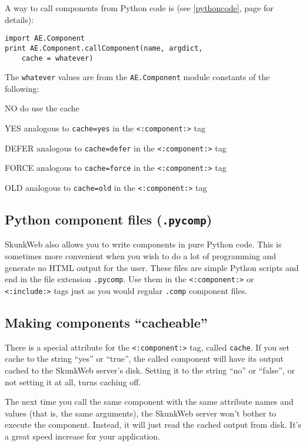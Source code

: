 \documentclass{manual}
\begin{document}
A way to call components from Python code is (see \ref{pythoncode},
page \pageref{pythoncode} for details):
\begin{verbatim}
import AE.Component
print AE.Component.callComponent(name, argdict, 
	cache = whatever)
\end{verbatim}
The \texttt{whatever} values are from the \texttt{AE.Component} module constants of the following:
\label{whatevervals}
\begin{argdesc}
\item[NO] do use the cache
\item[YES] analogous to \texttt{cache=yes} in the \texttt{<:component:>} tag
\item[DEFER] analogous to \texttt{cache=defer} in the
\texttt{<:component:>} tag
\item[FORCE] analogous to \texttt{cache=force} in the
\texttt{<:component:>} tag
\item[OLD] analogous to \texttt{cache=old} in the
\texttt{<:component:>} tag
\end{argdesc}

\subsection{Python component files (\texttt{.pycomp})}

SkunkWeb also allows you to write components in pure Python
code. This is sometimes more convenient when you wish to do a lot
of programming and generate no HTML output for the user. These files
are simple Python scripts and end in the file extension \texttt{.pycomp}.
Use them in the \texttt{<:component:>} or
\texttt{<:include:>} 
tags just as you would regular \texttt{.comp} component files.


\subsection{Making components ``cacheable''}
\label{tagcomponentcaching}

There is a special attribute for the \texttt{<:component:>} 
tag, called \texttt{cache}. If you set cache to the string ``yes''
or ``true'', the called component will have its output cached 
to the SkunkWeb server's disk. Setting it to the string ``no'' or
``false'', or not setting it at all, turns caching off.

The next time you call the same component with the same attribute
names and values (that is, the same arguments), the SkunkWeb server
won't bother to execute the component. Instead, it will just read the
cached output from disk. It's a great speed increase for your
application.
\end{document}

